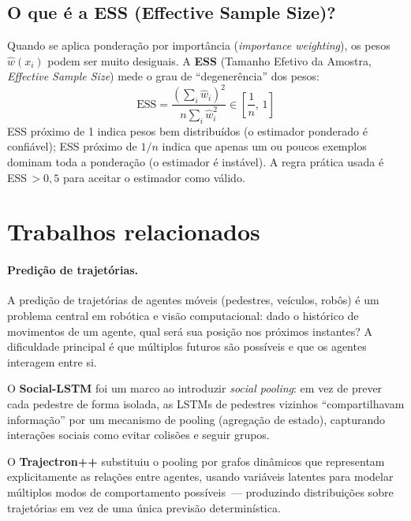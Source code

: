 \documentclass[11pt,a4paper]{article}
\begin{document}
\subsection*{O que \'e a ESS (Effective Sample Size)?}

Quando se aplica pondera\c{c}\~ao por import\^ancia (\emph{importance weighting}), os pesos $\hat{w}(x_i)$ podem ser muito desiguais. A \textbf{ESS} (Tamanho Efetivo da Amostra, \emph{Effective Sample Size}) mede o grau de ``degen\-er\^en\-cia'' dos pesos:
\[
\mathrm{ESS} = \frac{(\sum_i \hat{w}_i)^2}{n \sum_i \hat{w}_i^2} \in \left[\frac{1}{n},\, 1\right]
\]
ESS pr\'oximo de 1 indica pesos bem distribu\'idos (o estimador ponderado \'e confi\'avel); ESS pr\'oximo de $1/n$ indica que apenas um ou poucos exemplos dominam toda a pondera\c{c}\~ao (o estimador \'e inst\'avel). A regra pr\'atica usada \'e ESS\,$> 0{,}5$ para aceitar o estimador como v\'alido.


\section*{Trabalhos relacionados}

\paragraph{Predi\c{c}\~ao de trajet\'orias.}
A predi\c{c}\~ao de trajet\'orias de agentes m\'oveis (pedestres, ve\'iculos, rob\^os) \'e um problema central em rob\'otica e vis\~ao computacional: dado o hist\'orico de movimentos de um agente, qual ser\'a sua posi\c{c}\~ao nos pr\'oximos instantes? A dificuldade principal \'e que m\'ultiplos futuros s\~ao poss\'iveis e que os agentes interagem entre si.

O \textbf{Social-LSTM} \cite{alahi2016} foi um marco ao introduzir \emph{social pooling}: em vez de prever cada pedestre de forma isolada, as LSTMs de pedestres vizinhos ``compartilhavam informa\c{c}\~ao'' por um mecanismo de pooling (agrega\c{c}\~ao de estado), capturando intera\c{c}\~oes sociais como evitar colis\~oes e seguir grupos.

O \textbf{Trajectron++} \cite{salzmann2020} substituiu o pooling por grafos din\^amicos que representam explicitamente as rela\c{c}\~oes entre agentes, usando vari\'aveis latentes para modelar m\'ultiplos modos de comportamento poss\'iveis~--- produzindo distribui\c{c}\~oes sobre trajet\'orias em vez de uma \'unica previs\~ao determin\'istica.
\end{document}
